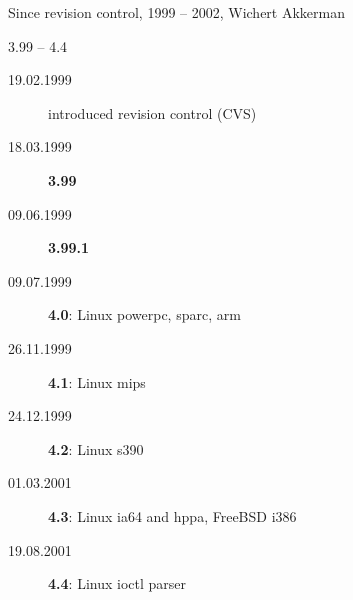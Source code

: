 \documentclass[unicode,aspectratio=169]{beamer}
\begin{document}
\begin{frame}{Since revision control, 1999 -- 2002, Wichert Akkerman}
	\begin{block}{3.99 -- 4.4}
	\begin{description}
		\item[19.02.1999] introduced revision control (CVS)
		\item[18.03.1999] {\bf 3.99}
		\item[09.06.1999] {\bf 3.99.1}
		\item[09.07.1999] {\bf 4.0}: Linux powerpc, sparc, arm
		\item[26.11.1999] {\bf 4.1}: Linux mips
		\item[24.12.1999] {\bf 4.2}: Linux s390
		\item[01.03.2001] {\bf 4.3}: Linux ia64 and hppa, FreeBSD i386
		\item[19.08.2001] {\bf 4.4}: Linux ioctl parser
	\end{description}
	\end{block}
\end{frame}
\end{document}
